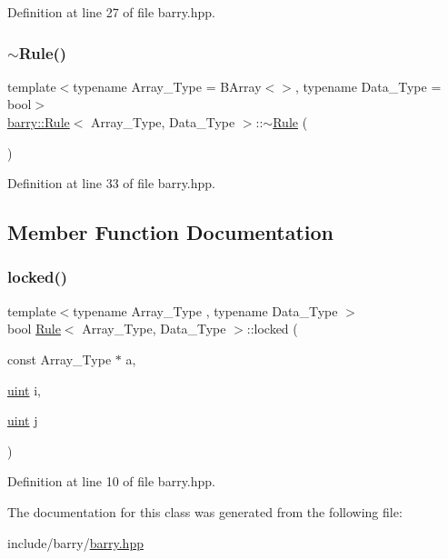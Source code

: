 Definition at line 27 of file barry.\+hpp.

\mbox{\label{classbarry_1_1_rule_a5b56209f553a6fe5b841395eec8e3101}} 
\subsubsection{\texorpdfstring{$\sim$\+Rule()}{~Rule()}}
{\footnotesize\ttfamily template$<$typename Array\+\_\+\+Type  = B\+Array$<$$>$, typename Data\+\_\+\+Type  = bool$>$ \\
\hyperlink{classbarry_1_1_rule}{barry\+::\+Rule}$<$ Array\+\_\+\+Type, Data\+\_\+\+Type $>$\+::$\sim$\hyperlink{classbarry_1_1_rule}{Rule} (\begin{DoxyParamCaption}{ }\end{DoxyParamCaption})\hspace{0.3cm}{\ttfamily [inline]}}



Definition at line 33 of file barry.\+hpp.



\subsection{Member Function Documentation}
\mbox{\label{classbarry_1_1_rule_a0a9a115c6951a5c8de699d4ff9f69060}} 
\subsubsection{\texorpdfstring{locked()}{locked()}}
{\footnotesize\ttfamily template$<$typename Array\+\_\+\+Type , typename Data\+\_\+\+Type $>$ \\
bool \hyperlink{classbarry_1_1_rule}{Rule}$<$ Array\+\_\+\+Type, Data\+\_\+\+Type $>$\+::locked (\begin{DoxyParamCaption}\item[{const Array\+\_\+\+Type $\ast$}]{a,  }\item[{\hyperlink{namespacebarry_a11dfc53ddb4672278319aa04f1e09a6c}{uint}}]{i,  }\item[{\hyperlink{namespacebarry_a11dfc53ddb4672278319aa04f1e09a6c}{uint}}]{j }\end{DoxyParamCaption})\hspace{0.3cm}{\ttfamily [inline]}}



Definition at line 10 of file barry.\+hpp.



The documentation for this class was generated from the following file\+:\begin{DoxyCompactItemize}
\item 
include/barry/\hyperlink{barry_8hpp}{barry.\+hpp}\end{DoxyCompactItemize}
